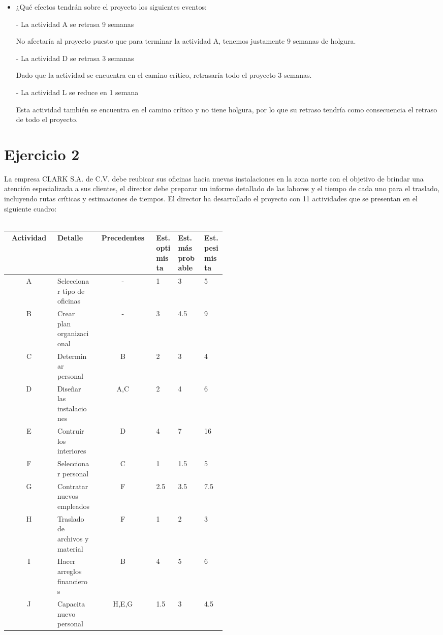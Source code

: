 \documentclass[12pt]{article}
\begin{document}
\begin{itemize}
    \item ¿Qué efectos tendrán sobre el proyecto los siguientes eventos:

    - La actividad A se retrasa 9 semanas

No afectaría al proyecto puesto que para terminar la actividad A, tenemos
justamente 9 semanas de holgura.

    - La actividad D se retrasa 3 semanas

Dado que la actividad se encuentra en el camino crítico, retrasaría todo el
proyecto 3 semanas.

    - La actividad L se reduce en 1 semana

Esta actividad también se encuentra en el camino crítico y no tiene holgura, por
lo que su retraso tendría como consecuencia el retraso de todo el proyecto.

\end{itemize}

\section{Ejercicio 2}

La empresa CLARK S.A. de C.V. debe reubicar sus oficinas hacia nuevas
instalaciones en la zona norte con el objetivo de brindar una atención
especializada a sus clientes, el director debe preparar un informe detallado de
las labores y el tiempo de cada uno para el traslado, incluyendo rutas críticas
y estimaciones de tiempos. El director ha desarrollado el proyecto con 11
actividades que se presentan en el siguiente cuadro: \\
\\
\begin{center}
  \begin{tabular}{cp{0.18\linewidth}cp{0.1\linewidth}p{0.12\linewidth}p{0.1\linewidth}}
    Actividad   &    Detalle    &   Precedentes & Est. optimista  & Est.
    más probable    &   Est. pesimista    \\
    \hline
      A  & Seleccionar tipo de oficinas & -      &  1    &  3   &  5  \\
      B  & Crear plan organizacional    & -      &  3    &  4.5 &  9  \\ 
      C  & Determinar personal          & B      &  2    &  3   &  4  \\ 
      D  & Diseñar las instalaciones    & A,C    &  2    &  4   &  6  \\ 
      E  & Contruir los interiores      & D      &  4    &  7   &  16 \\
      F  & Seleccionar personal         & C      &  1    &  1.5 &  5  \\
      G  & Contratar nuevos empleados   & F      &  2.5  &  3.5 &  7.5\\
      H  & Traslado de archivos y material & F      &  1    &  2   &  3  \\
      I  & Hacer arreglos financieros   & B      &  4    &  5   &  6  \\
      J  & Capacita nuevo personal      & H,E,G  &  1.5  &  3   &  4.5
  \end{tabular}
\end{center}
\end{document}
